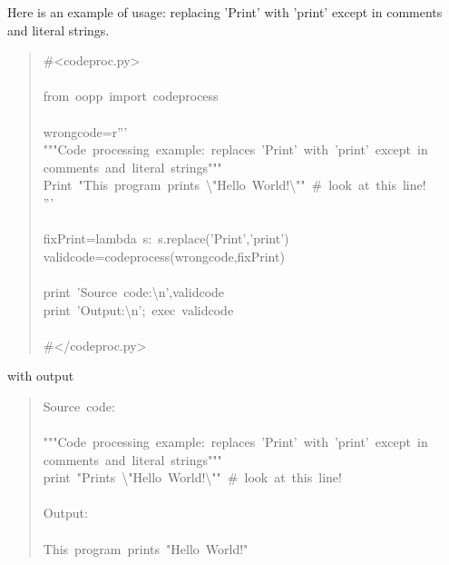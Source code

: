 \documentclass[10pt,english]{article}
\begin{document}
Here is an example of usage: replacing 'Print' with 'print' except in
comments and literal strings.
\begin{quote}
\begin{ttfamily}\begin{flushleft}
\mbox{{\#}<codeproc.py>}\\
\mbox{}\\
\mbox{from~oopp~import~codeprocess}\\
\mbox{}\\
\mbox{wrongcode=r'''}\\
\mbox{"""Code~processing~example:~replaces~'Print'~with~'print'~except~in}\\
\mbox{comments~and~literal~strings"""}\\
\mbox{Print~"This~program~prints~{\textbackslash}"Hello~World!{\textbackslash}""~{\#}~look~at~this~line!}\\
\mbox{'''}\\
\mbox{}\\
\mbox{fixPrint=lambda~s:~s.replace('Print','print')}\\
\mbox{validcode=codeprocess(wrongcode,fixPrint)}\\
\mbox{}\\
\mbox{print~'Source~code:{\textbackslash}n',validcode}\\
\mbox{print~'Output:{\textbackslash}n';~exec~validcode}\\
\mbox{}\\
\mbox{{\#}</codeproc.py>}
\end{flushleft}\end{ttfamily}
\end{quote}

with output
\begin{quote}
\begin{ttfamily}\begin{flushleft}
\mbox{Source~code:}\\
\mbox{}\\
\mbox{"""Code~processing~example:~replaces~'Print'~with~'print'~except~in}\\
\mbox{comments~and~literal~strings"""}\\
\mbox{print~"Prints~{\textbackslash}"Hello~World!{\textbackslash}""~{\#}~look~at~this~line!}\\
\mbox{}\\
\mbox{Output:}\\
\mbox{}\\
\mbox{This~program~prints~"Hello~World!"}
\end{flushleft}\end{ttfamily}
\end{quote}
\end{document}
